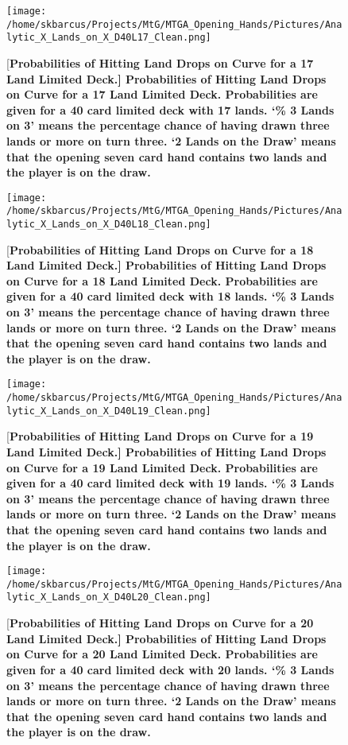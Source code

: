 \documentclass[oneside]{book}   %
\begin{document}
	\begin{figure}[!ht]
	\centering
	\centerline{\texttt{[image: /home/skbarcus/Projects/MtG/MTGA\_Opening\_Hands/Pictures/Analytic\_X\_Lands\_on\_X\_D40L17\_Clean.png]}}
	[\bf{Probabilities of Hitting Land Drops on Curve for a 17 Land Limited Deck.}]{
	{\bf{Probabilities of Hitting Land Drops on Curve for a 17 Land Limited Deck.}} Probabilities are given for a 40 card limited deck with 17 lands. `\% 3 Lands on 3' means the percentage chance of having drawn three lands or more on turn three. `2 Lands on the Draw' means that the opening seven card hand contains two lands and the player is on the draw.}
	\label{fig:17_curve}
	\end{figure}	
	
	\begin{figure}[!ht]
	\centering
	\centerline{\texttt{[image: /home/skbarcus/Projects/MtG/MTGA\_Opening\_Hands/Pictures/Analytic\_X\_Lands\_on\_X\_D40L18\_Clean.png]}}
	[\bf{Probabilities of Hitting Land Drops on Curve for a 18 Land Limited Deck.}]{
	{\bf{Probabilities of Hitting Land Drops on Curve for a 18 Land Limited Deck.}} Probabilities are given for a 40 card limited deck with 18 lands. `\% 3 Lands on 3' means the percentage chance of having drawn three lands or more on turn three. `2 Lands on the Draw' means that the opening seven card hand contains two lands and the player is on the draw.}
	\label{fig:18_curve}
	\end{figure}	
	
	\begin{figure}[!ht]
	\centering
	\centerline{\texttt{[image: /home/skbarcus/Projects/MtG/MTGA\_Opening\_Hands/Pictures/Analytic\_X\_Lands\_on\_X\_D40L19\_Clean.png]}}
	[\bf{Probabilities of Hitting Land Drops on Curve for a 19 Land Limited Deck.}]{
	{\bf{Probabilities of Hitting Land Drops on Curve for a 19 Land Limited Deck.}} Probabilities are given for a 40 card limited deck with 19 lands. `\% 3 Lands on 3' means the percentage chance of having drawn three lands or more on turn three. `2 Lands on the Draw' means that the opening seven card hand contains two lands and the player is on the draw.}
	\label{fig:19_curve}
	\end{figure}	
	
	\begin{figure}[!ht]
	\centering
	\centerline{\texttt{[image: /home/skbarcus/Projects/MtG/MTGA\_Opening\_Hands/Pictures/Analytic\_X\_Lands\_on\_X\_D40L20\_Clean.png]}}
	[\bf{Probabilities of Hitting Land Drops on Curve for a 20 Land Limited Deck.}]{
	{\bf{Probabilities of Hitting Land Drops on Curve for a 20 Land Limited Deck.}} Probabilities are given for a 40 card limited deck with 20 lands. `\% 3 Lands on 3' means the percentage chance of having drawn three lands or more on turn three. `2 Lands on the Draw' means that the opening seven card hand contains two lands and the player is on the draw.}
	\label{fig:20_curve}
	\end{figure}	
	
\end{document}
